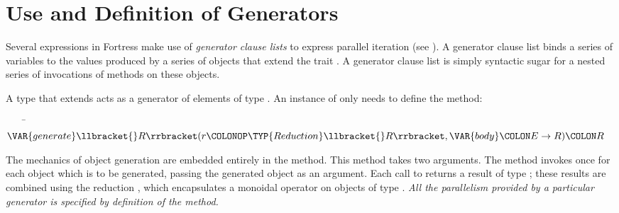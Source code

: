 %
%
%
%

\section{Use and Definition of Generators}

Several expressions in Fortress make use of \emph{generator clause
  lists} to express parallel iteration (see ).  A
generator clause list binds a series of variables to the values produced by a
series of objects that extend the trait .  A generator clause
list is simply syntactic sugar for a nested series of invocations of
methods on these objects.

A type that extends  acts
as a generator of elements of type .  An instance of
 only needs to define the
 method:
\begin{Fortress}
{\tt~~~~}\pushtabs\=\+\(    \VAR{generate}\llbracket{}R\rrbracket(r\COLONOP\TYP{Reduction}\llbracket{}R\rrbracket, \VAR{body}\COLON E\rightarrow{}R)\COLON R\)\-\\\poptabs
\end{Fortress}
The mechanics of object generation are embedded entirely in the
 method.  This method takes two arguments.  The  method invokes  once for each
object which is to be generated, passing the generated object as an
argument.  Each call to  returns a result of type ; these results are combined using the reduction , which encapsulates a monoidal operator on objects of type .    \emph{All the parallelism provided by a
  particular generator is specified by definition of the  method.}

